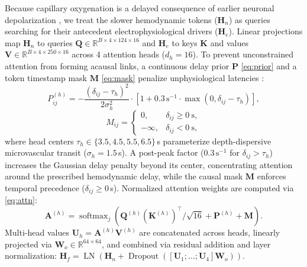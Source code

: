\documentclass[journal]{IEEEtran}
\begin{document}
Because capillary oxygenation is a delayed consequence of earlier neuronal depolarization \cite{buxton1998dynamics, glover1999deconvolution}, we treat the slower hemodynamic tokens ($\mathbf{H}_n$) as queries searching for their antecedent electrophysiological drivers ($\mathbf{H}_e$). Linear projections map $\mathbf{H}_n$ to queries $\mathbf{Q} \in \mathbb{R}^{B \times 4 \times 124 \times 16}$ and $\mathbf{H}_e$ to keys $\mathbf{K}$ and values $\mathbf{V} \in \mathbb{R}^{B \times 4 \times 250 \times 16}$ across 4 attention heads ($d_h = 16$). To prevent unconstrained attention from forming acausal links, a continuous delay prior $\mathbf{P}$ \eqref{eq:prior} and a token timestamp mask $\mathbf{M}$ \eqref{eq:mask} penalize unphysiological latencies \cite{glover1999deconvolution}:
\begin{equation}
P_{ij}^{(h)} = -\frac{(\delta_{ij} - \tau_h)^2}{2\sigma_h^2} \cdot \left[1 + 0.3\,\mathrm{s}^{-1} \cdot \max(0, \delta_{ij} - \tau_h)\right],
\label{eq:prior}
\end{equation}
\begin{equation}
M_{ij} = \begin{cases}
0, & \delta_{ij} \ge 0\ \mathrm{s}, \\
-\infty, & \delta_{ij} < 0\ \mathrm{s},
\end{cases}
\label{eq:mask}
\end{equation}
where head centers $\tau_h \in \{3.5, 4.5, 5.5, 6.5\}$\,s parameterize depth-dispersive microvascular transit ($\sigma_h = 1.5$\,s). A post-peak factor ($0.3\,\mathrm{s}^{-1}$ for $\delta_{ij} > \tau_h$) increases the Gaussian delay penalty beyond its center, concentrating attention around the prescribed hemodynamic delay, while the causal mask $\mathbf{M}$ enforces temporal precedence ($\delta_{ij} \ge 0$\,s). Normalized attention weights are computed via \eqref{eq:attn}:
\begin{equation}
\mathbf{A}^{(h)} = \operatorname{softmax}_{j}\left(\mathbf{Q}^{(h)}(\mathbf{K}^{(h)})^{\top}/\sqrt{16} + \mathbf{P}^{(h)} + \mathbf{M}\right).
\label{eq:attn}
\end{equation}
Multi-head values $\mathbf{U}_h = \mathbf{A}^{(h)}\mathbf{V}^{(h)}$ are concatenated across heads, linearly projected via $\mathbf{W}_o \in \mathbb{R}^{64 \times 64}$, and combined via residual addition and layer normalization: $\mathbf{H}_f = \operatorname{LN}(\mathbf{H}_n + \operatorname{Dropout}([\mathbf{U}_1; \dots; \mathbf{U}_4]\mathbf{W}_o))$.
\end{document}
